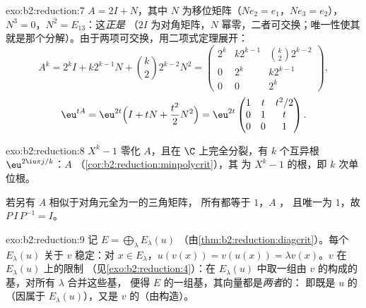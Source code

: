 \begin{solution}{exo:b2:reduction:7}
$A = 2I + N$，其中 $N$ 为移位矩阵（$N e_2 = e_1$，$Ne_3 = e_2$），
$N^3 = 0$，$N^2 = E_{13}$：这\emph{正是}
（$2I$ 为对角矩阵，$N$ 幂零，二者可交换；唯一性使其
就是那个分解）。由于两项可交换，用二项式定理展开：
\[
A^k = 2^k I + k 2^{k-1} N + \binom k2 2^{k-2} N^2
= \begin{pmatrix}
2^k & k2^{k-1} & \binom k2 2^{k-2}\\
0 & 2^k & k2^{k-1}\\
0 & 0 & 2^k
\end{pmatrix},
\]
\[
\eu^{tA} = \eu^{2t}\Bigl(I + tN + \frac{t^2}{2}N^2\Bigr)
= \eu^{2t}\begin{pmatrix}
1 & t & t^2/2\\
0 & 1 & t\\
0 & 0 & 1
\end{pmatrix}.
\]
\end{solution}

\begin{solution}{exo:b2:reduction:8}
$X^k - 1$ 零化 $A$，且在 $\C$ 上完全分裂，有 $k$ 个互异根
$\eu^{2\iu\pi j/k}$：$A$ 
（\cref{cor:b2:reduction:minpolycrit}），其
为 $X^k - 1$ 的根，即 $k$ 次单位根。

若另有 $A$ 相似于对角元全为一的三角矩阵，
所有都等于 $1$，$A$ ，
且唯一为 $1$，故 $P\,I\,P^{-1} = I$。
\end{solution}

\begin{solution}{exo:b2:reduction:9}
记 $E = \bigoplus_\lambda E_\lambda(u)$
（由\cref{thm:b2:reduction:diagcrit}）。每个 $E_\lambda(u)$
关于 $v$ 稳定：对 $x \in E_\lambda$，$u(v(x)) = v(u(x)) = \lambda
v(x)$。$v$ 在 $E_\lambda(u)$ 上的限制
（见\cref{exo:b2:reduction:4}）：在 $E_\lambda(u)$ 中取一组由
$v$ 的构成的基，对所有 $\lambda$ 合并这些基，
便得 $E$ 的一组基，其向量都是\emph{两者}的：
即既是 $u$ 的（因属于 $E_\lambda(u)$），又是 $v$ 的（由构造）。
\end{solution}

